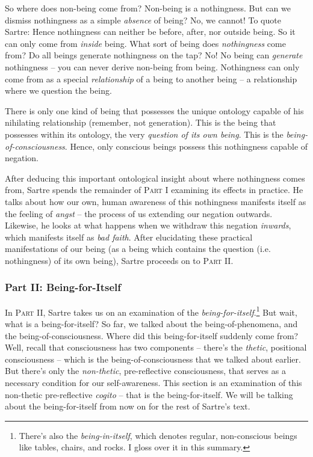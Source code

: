 So where does non-being come from? Non-being is a nothingness. But can we dismiss nothingness as a simple \emph{absence} of being? No, we cannot! To quote Sartre:  Hence nothingness can neither be before, after, nor outside being. So it can only come from \emph{inside} being. What sort of being does \emph{nothingness} come from? Do all beings generate nothingness on the tap? No! No being can \emph{generate} nothingness -- you can never derive non-being from being. Nothingness can only come from as a special \emph{relationship} of a being to another being -- a relationship where we question the being.

There is only one kind of being that possesses the unique ontology capable of his nihilating relationship (remember, not generation). This is the being that possesses within its ontology, the very \emph{question of its own being}. This is the \emph{being-of-consciousness}. Hence, only conscious beings possess this nothingness capable of negation.

After deducing this important ontological insight about where nothingness comes from, Sartre spends the remainder of \textsc{Part I} examining its effects in practice. He talks about how our own, human awareness of this nothingness manifests itself as the feeling of \emph{angst} -- the process of us extending our negation outwards. Likewise, he looks at what happens when we withdraw this negation \emph{inwards}, which manifests itself as \emph{bad faith}. After elucidating these practical manifestations of our being (as a being which contains the question (i.e. nothingness) of its own being), Sartre proceeds on to \textsc{Part II}.

\subsubsection{Part II: Being-for-Itself}

In \textsc{Part II}, Sartre takes us on an examination of the \emph{being-for-itself}.\footnote{There's also the \emph{being-in-itself}, which denotes regular, non-conscious beings like tables, chairs, and rocks. I gloss over it in this summary.} But wait, what is a being-for-itself? So far, we talked about the being-of-phenomena, and the being-of-consciousness. Where did this being-for-itself suddenly come from? Well, recall that consciousness has two components -- there's the \emph{thetic}, positional consciousness -- which is the being-of-consciousness that we talked about earlier. But there's only the \emph{non-thetic}, pre-reflective consciousness, that serves as a necessary condition for our self-awareness. This section is an examination of this non-thetic pre-reflective \emph{cogito} -- that is the being-for-itself. We will be talking about the being-for-itself from now on for the rest of Sartre's text.


